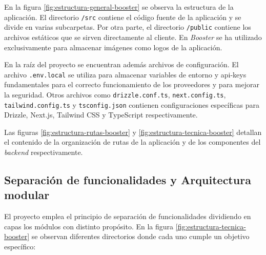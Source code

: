 En la figura \ref{fig:estructura-general-booster} se observa la estructura de la aplicación. El directorio \texttt{/src} contiene el código fuente de la aplicación y se divide en varias subcarpetas. Por otra parte, el directorio \texttt{/public} contiene los archivos estáticos que se sirven directamente al cliente. En \textit{Booster} se ha utilizado exclusivamente para almacenar imágenes como logos de la aplicación. 

En la raíz del proyecto se encuentran además archivos de configuración. El archivo \texttt{.env.local} se utiliza para almacenar variables de entorno y api-keys fundamentales para el correcto funcionamiento de los proveedores y para mejorar la seguridad. Otros archivos como \texttt{drizzle.conf.ts}, \texttt{next.config.ts}, \texttt{tailwind.config.ts} y \texttt{tsconfig.json} contienen configuraciones específicas para Drizzle, Next.js, Tailwind CSS y TypeScript respectivamente.

Las figuras \ref{fig:estructura-rutas-booster} y \ref{fig:estructura-tecnica-booster} detallan el contenido de la organización de rutas de la aplicación y de los componentes del \textit{backend} respectivamente. 

\subsection{Separación de funcionalidades y Arquitectura modular}

El proyecto emplea el principio de separación de funcionalidades dividiendo en capas los módulos con distinto propósito. En la figura \ref{fig:estructura-tecnica-booster} se observan diferentes directorios donde cada uno cumple un objetivo específico:


